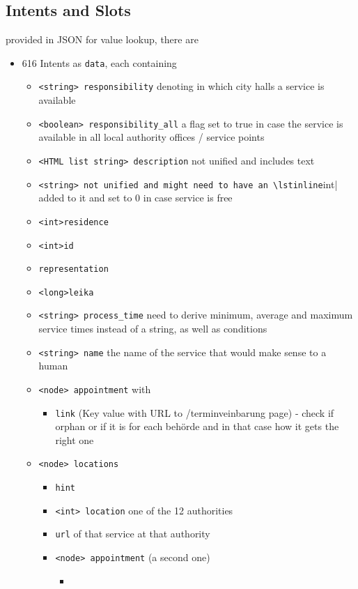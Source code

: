 \subsection{Intents and Slots} 
provided in JSON for value lookup, there are
\begin{itemize}
	\item 616 Intents as \lstinline|data|, each containing
	\begin{itemize}
		\item \lstinline|<string> responsibility| denoting in which city halls a service is available
		\item \lstinline|<boolean> responsibility_all| a flag set to true in case the service is available in all local authority offices / service points
		\item \lstinline|<HTML list string> description| not unified and includes text
		\item  \lstinline|<string> not unified and might need to have an \lstinline|int| added to it and set to 0 in case service is free
		\item \lstinline|<int>residence|
		\item \lstinline|<int>id|
		\item \lstinline|representation|
		\item \lstinline|<long>leika|
		\item \lstinline|<string> process_time| need to derive minimum, average and maximum service times instead of a string, as well as conditions 
		\item \lstinline|<string> name| the name of the service that would make sense to a human
		\item \lstinline|<node> appointment| with 
		\begin{itemize}
			\item \lstinline|link| (Key value with URL to /terminveinbarung page) - check if orphan or if it is for each beh\"orde and in that case how it gets the right one
		\end{itemize}	 
		\item \lstinline|<node> locations| 
		\begin{itemize}
			\item \lstinline|hint|
			\item \lstinline|<int> location| one of the 12 authorities
			\item \lstinline|url| of that service at that authority
			\item \lstinline|<node> appointment| (a second one)
			\begin{itemize}
				\item 
			\end{itemize}
		\end{itemize}
		

\end{itemize}
\end{itemize}
